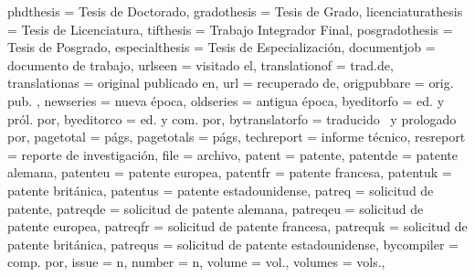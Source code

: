 {	phdthesis        = {Tesis de Doctorado},
	gradothesis      = {Tesis de Grado},
	licenciaturathesis = {Tesis de Licenciatura},
	tifthesis        = {Trabajo Integrador Final},
	posgradothesis   = {Tesis de Posgrado},
	especialthesis   = {Tesis de Especialización},
	documentjob      = {documento de trabajo},
	urlseen          = {visitado el\addspace},
	translationof    = {trad\adddot\addspace de},
	translationas    = {original publicado en},
	url              = {recuperado de},
	origpubbare      = {orig\adddotspace pub\adddotspace},
	newseries        = {nueva época},
	oldseries        = {antigua época},
	byeditorfo       = {ed\adddotspace y pról\adddotspace por},
	byeditorco       = {ed\adddotspace y com\adddotspace por},
	bytranslatorfo   = {traducido \lbx@lfromlang\ y prologado por},
	pagetotal        = {págs},
	pagetotals       = {págs},
	techreport       = {informe técnico},
	resreport        = {reporte de investigación},
	file             = {archivo},
	patent           = {patente},
	patentde         = {patente alemana},
	patenteu         = {patente europea},
	patentfr         = {patente francesa},
	patentuk         = {patente británica},
	patentus         = {patente estadounidense},
	patreq           = {solicitud de patente},
	patreqde         = {solicitud de patente alemana},
	patreqeu         = {solicitud de patente europea},
	patreqfr         = {solicitud de patente francesa},
	patrequk         = {solicitud de patente británica},
	patrequs         = {solicitud de patente estadounidense},
	bycompiler       = {comp\adddotspace por},
	issue            = {n},
	number           = {n},
	volume           = {vol\adddot},
	volumes          = {vols\adddot},
}

\makeatletter
{}
\makeatother
